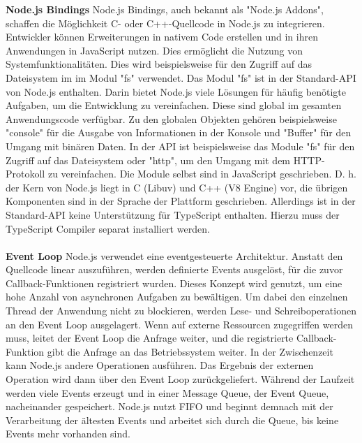 \noindent
\textbf{Node.js Bindings} \newline
Node.js Bindings, auch bekannt als "Node.js Addons", schaffen die Möglichkeit C- oder C++-Quellcode in Node.js zu integrieren. Entwickler können Erweiterungen in nativem Code erstellen und in ihren Anwendungen in JavaScript nutzen. Dies ermöglicht die Nutzung von Systemfunktionalitäten. Dies wird beispielsweise für den Zugriff auf das Dateisystem im im Modul "fs" verwendet. Das Modul "fs" ist in der Standard-API von Node.js enthalten. Darin bietet Node.js viele Lösungen für häufig benötigte Aufgaben, um die Entwicklung zu vereinfachen. Diese sind global im gesamten Anwendungscode verfügbar. Zu den globalen Objekten gehören beispielsweise "console" für die Ausgabe von Informationen in der Konsole und "Buffer" für den Umgang mit binären Daten.  In der API ist beispielsweise das Module "fs" für den Zugriff auf das Dateisystem oder "http", um den Umgang mit dem HTTP-Protokoll zu vereinfachen. \cite{OpenJSFoundation.} Die Module selbst sind in JavaScript geschrieben. D. h. der Kern von Node.js liegt in C (Libuv) und C++ (V8 Engine)  vor, die übrigen Komponenten sind in der Sprache der Plattform geschrieben. \cite{Springer.2022} Allerdings ist in der Standard-API keine Unterstützung für TypeScript enthalten. Hierzu muss der TypeScript Compiler separat installiert werden. \cite{OpenJSFoundation.2022}\\
\\
\noindent
\textbf{Event Loop} \newline
Node.js verwendet eine eventgesteuerte Architektur. Anstatt den Quellcode linear auszuführen, werden definierte Events ausgelöst, für die zuvor Callback-Funktionen registriert wurden. Dieses Konzept wird genutzt, um eine hohe Anzahl von asynchronen Aufgaben zu bewältigen. Um dabei den einzelnen Thread der Anwendung nicht zu blockieren, werden Lese- und Schreiboperationen an den Event Loop ausgelagert.  Wenn auf externe Ressourcen zugegriffen werden muss, leitet der Event Loop die Anfrage weiter, und die registrierte Callback-Funktion gibt die Anfrage an das Betriebssystem weiter. In der Zwischenzeit kann Node.js andere Operationen ausführen. Das Ergebnis der externen Operation wird dann über den Event Loop zurückgeliefert. \cite{Springer.2022} \newline 
Während der Laufzeit werden viele Events erzeugt und in einer Message Queue, der Event Queue, nacheinander gespeichert. Node.js nutzt FIFO und beginnt demnach mit der Verarbeitung der ältesten Events und arbeitet sich durch die Queue, bis keine Events mehr vorhanden sind. \cite{OpenJSFoundation.o.J.} \\

